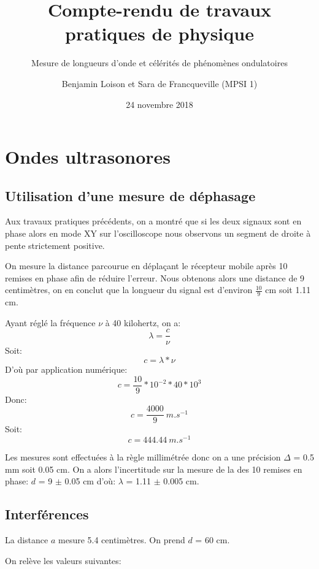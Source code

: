 \documentclass{scrartcl}
\begin{document}
	\title{Compte-rendu de travaux pratiques de physique}
	\subtitle{Mesure de longueurs d'onde et célérités de phénomènes ondulatoires}
	\author{Benjamin Loison et Sara de Francqueville (MPSI 1)}
	\date{24 novembre 2018}
	\maketitle

	\section{Ondes ultrasonores}

	\subsection{Utilisation d'une mesure de déphasage}

	Aux travaux pratiques précédents, on a montré que si les deux signaux sont en phase alors en mode XY sur l'oscilloscope nous observons un segment de droite à pente strictement positive.
	
	On mesure la distance parcourue en déplaçant le récepteur mobile après 10 remises en phase afin de réduire l'erreur. Nous obtenons alors une distance de 9 centimètres, on en conclut que la longueur du signal est d'environ $\frac{10}{9}$ cm soit 1.11 cm.
	
	Ayant réglé la fréquence $\nu$ à 40 kilohertz, on a:
		$$\lambda=\frac{c}{\nu}$$
	Soit:
		$$c=\lambda*\nu$$
	D'où par application numérique:
		$$c=\frac{10}{9}*10^{-2}*40*10^3$$
	Donc:
		$$c=\frac{4000}{9}\ m.s^{-1}$$
	Soit:
		$$c=444.44\ m.s^{-1}$$
		
		Les mesures sont effectuées à la règle millimétrée donc on a une précision $\Delta$ = 0.5 mm soit 0.05 cm. On a alors l'incertitude sur la mesure de la des 10 remises en phase: $d$ = 9 $\pm$ 0.05 cm d'où: $\lambda$ = 1.11 $\pm$ 0.005 cm.\\

	\subsection{Interférences}
	
	  La distance $a$ mesure 5.4 centimètres. On prend $d$ = 60 cm.
		
		On relève les valeurs suivantes:
		
\end{document}
